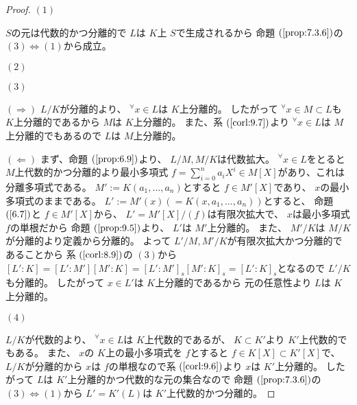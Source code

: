\documentclass[../master_galois_theory]{subfiles}
\begin{document}
\begin{proof}
  $(1)$

  $S$の元は代数的かつ分離的で $L$は $K$上 $S$で生成されるから
  命題 $(\mathrm{\ref{prop:7.3.6}})$の $(3) \Leftrightarrow (1)$から成立。

  $(2)$

  $(3)$

  $(\Rightarrow)$
  $L/K$が分離的より、 ${}^\forall x \in L$は $K$上分離的。
  したがって ${}^\forall x \in M \subset L$も $K$上分離的であるから
  $M$は $K$上分離的。
  また、系 $(\mathrm{\ref{corl:9.7}})$より
  ${}^\forall x \in L$は $M$上分離的でもあるので $L$は $M$上分離的。

  $(\Leftarrow)$
  まず、命題 $(\mathrm{\ref{prop:6.9}})$より、 $L/M , M/K$は代数拡大。
  ${}^\forall x \in L$をとると $M$上代数的かつ分離的より最小多項式 $f = \sum_{i=0}^n a_i X^i \in M[X]$があり、これは分離多項式である。
  $M' := K(a_1 , \dots , a_n)$とすると $f \in M'[X]$であり、 $x$の最小多項式のままである。
  $L' := M'(x) (= K(x , a_1 , \dots , a_n))$とすると、
  命題 $(\mathrm{\ref{6.7}})$と $f \in M'[X]$から、
  $L' = M'[X]/(f)$は有限次拡大で、 $x$は最小多項式 $f$の単根だから
  命題 $(\mathrm{\ref{prop:9.5}})$より、 $L'$は $M'$上分離的。
  また、 $M'/K$は $M/K$が分離的より定義から分離的。
  よって $L'/M , M'/K$が有限次拡大かつ分離的であることから
  系 $(\mathrm{\ref{corl:8.9}})$の $(3)$から
  $[L':K] = [L':M'][M':K] = [L':M']_s [M':K]_s = [L':K]_s$となるので
  $L'/K$も分離的。
  したがって $x \in L'$は $K$上分離的であるから
  元の任意性より $L$は $K$上分離的。

  $(4)$

  $L/K$が代数的より、 ${}^\forall x \in L$は $K$上代数的であるが、
  $K \subset K'$より $K'$上代数的でもある。
  また、 $x$の $K$上の最小多項式を $f$とすると
  $f \in K[X] \subset K'[X]$で、 $L/K$が分離的から
  $x$は $f$の単根なので系 $(\mathrm{\ref{corl:9.6}})$より
  $x$は $K'$上分離的。
  したがって $L$は $K'$上分離的かつ代数的な元の集合なので
  命題 $(\mathrm{\ref{prop:7.3.6}})$の $(3) \Leftrightarrow (1)$から
  $L' = K'(L)$は $K'$上代数的かつ分離的。
\end{proof}
\end{document}

